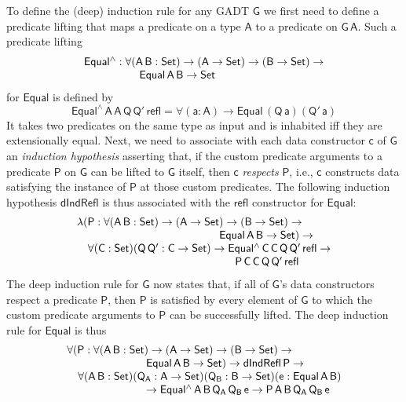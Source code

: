 \documentclass[sigplan,10pt]{acmart}
\begin{document}
To define the (deep) induction rule for any GADT $\mathsf{G}$ we first
need to define a predicate lifting that maps a predicate on a type
$\mathsf{A}$ to a predicate on $\mathsf{G\,A}$. Such a predicate
lifting
\[\begin{array}{l}
\mathsf{Equal^{\wedge} : \forall (A\,B : Set) \to (A \to Set)
  \to (B \to Set) \to}\\
\mathsf{\hspace*{0.7in}Equal\,A\,B \to Set}
\end{array}\]
for $\mathsf{Equal}$ is defined by
\[\mathsf{Equal^{\wedge}\,A\,A\,Q\,Q'\,refl = \forall (a :
  A) \to Equal\,(Q\,a)(Q'\,a)}\] It takes two predicates on the same
type as input and is inhabited iff they are extensionally equal.
Next, we need to associate with each data constructor $\mathsf{c}$ of
$\mathsf{G}$ an {\em induction hypothesis} asserting that, if the
custom predicate arguments to a predicate $\mathsf{P}$ on $\mathsf{G}$
can be lifted to $\mathsf{G}$ itself, then $\mathsf{c}$ {\em respects}
$\mathsf{P}$, i.e., $\mathsf{c}$ constructs data satisfying the
instance of $\mathsf{P}$ at those custom predicates. The following
induction hypothesis $\mathsf{dIndRefl}$ is thus associated with the
$\mathsf{refl}$ constructor for $\mathsf{Equal}$:
\begin{equation*}\label{eq:ind-refl}
\begin{array}{l}
\mathsf{\lambda (P : \forall (A\,B : Set) \to (A \to Set) \to (B \to
  Set) \to}\\
\mathsf{\hspace*{1.8in}Equal\,A\,B \to Set) \to} \\ 
\quad\mathsf{\forall (C : Set) (Q\, Q' : C \to Set) \to
  Equal^{\wedge}\,C\,C\,Q\,Q'\,refl \to}\\
\mathsf{\hspace*{2in}P\,C\,C\,Q\,Q'\,refl} 
\end{array}
\end{equation*}
The deep induction rule for $\mathsf{G}$ now states that, if all of
$\mathsf{G}$'s data constructors respect a predicate $\mathsf{P}$,
then $\mathsf{P}$ is satisfied by every element of $\mathsf{G}$ to
which the custom predicate arguments to $\mathsf{P}$ can be
successfully lifted.  The deep induction rule for $\mathsf{Equal}$ is
thus
\begin{equation}\label{eq:ind-equal}
\begin{array}{l}
\mathsf{\forall (P : \forall (A\,B : Set) \to (A \to Set) \to (B \to
  Set) \to}\\
\mathsf{\hspace*{1in}Equal\,A\,B \to Set) \to dIndRefl\,P \to}\\ \quad 
\mathsf{\forall (A\,B : Set) (Q_A : A \to Set) (Q_B : B \to Set)(e:
  Equal\,A\,B)}\\
\mathsf{\hspace*{1in}\to Equal^{\wedge}\,A\,B\,Q_A\,Q_B\,e \to
  P\,A\,B\,Q_A\,Q_B\,e}\\ 
\mathsf{\hspace*{2in} }
\end{array}
\end{equation}
\end{document}
